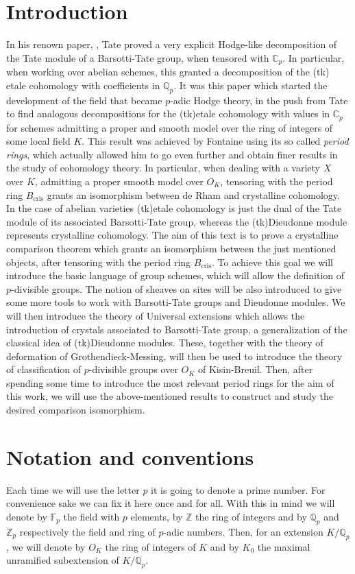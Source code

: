 \section*{Introduction}
In his renown paper, \cite{TatePC}, Tate proved a very explicit Hodge-like decomposition
of the Tate module of a Barsotti-Tate group, when tensored with $\mathbb{C}_p$.
In particular, when working over abelian schemes, this granted a decomposition of the
(tk) etale cohomology with coefficients in $\mathbb{Q}_p$.
It was this paper which started the development of the field that became $p$-adic Hodge theory,
in the push from Tate to find analogous decompositions for the (tk)etale cohomology
with values in $\mathbb{C}_p$ for schemes admitting a proper and smooth model over
the ring of integers of some local field $K$.
This result was achieved by Fontaine using its so called {\em period rings},
which actually allowed him to go even further and obtain finer results in the
study of cohomology theory.
In particular, when dealing with a variety $X$ over $K$, admitting
a proper smooth model over $O_K$, tensoring with the period ring $B_{\mathrm{cris}}$
grants an isomorphism between de Rham and crystalline cohomology.
In the case of abelian varieties (tk)etale cohomology is just the dual
of the Tate module of its associated Barsotti-Tate group,
whereas the (tk)Dieudonne module represents crystalline cohomology.
The aim of this text is to prove a crystalline comparison theorem which
grants an isomorphism between the just mentioned objects, after tensoring
with the period ring $B_{\mathrm{cris}}$.
To achieve this goal we will introduce the basic language of group schemes, which
will allow the definition of $p$-divisible groups.
The notion of sheaves on sites will be also introduced to give some
more tools to work with Barsotti-Tate groups and Dieudonne modules.
We will then introduce the theory of Universal extensions which allows the introduction
of crystals associated to Barsotti-Tate group, a generalization of the classical
idea of (tk)Dieudonne modules.
These, together with the theory of deformation of Grothendieck-Messing,
will then be used to introduce the theory of classification
of $p$-divisible groups over $O_K$ of Kisin-Breuil.
Then, after spending some time to introduce the most relevant period rings
for the aim of this work, we will use the above-mentioned results
to construct and study the desired comparison isomorphism.



\section*{Notation and conventions}
Each time we will use the letter $p$ it is going to denote a prime number.
For convenience sake we can fix it here once and for all.
With this in mind we will denote by $\mathbb{F}_{p}$ the field with $p$ elements,
by $\mathbb{Z}$ the ring of integers and by $\mathbb{Q}_p$ and $\mathbb{Z}_{p}$
respectively the field and ring of $p$-adic numbers.
Then, for an extension $K/\mathbb{Q}_p$, we will denote by $O_K$ the ring of
integers of $K$ and by $K_0$ the maximal unramified subextension of $K/\mathbb{Q}_p$.

